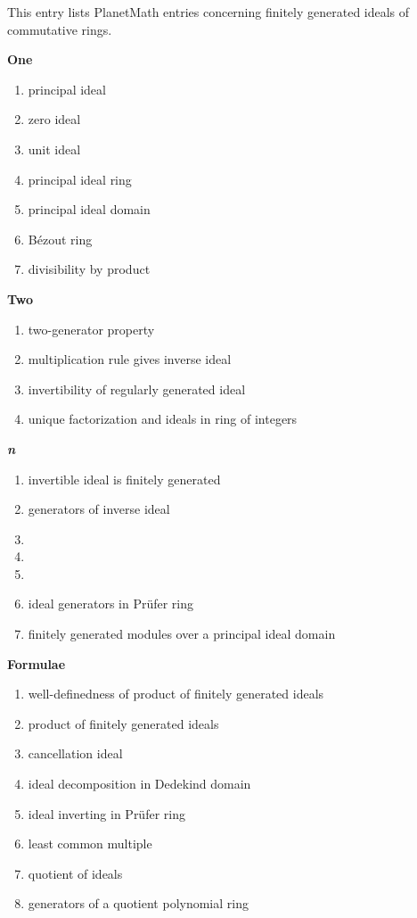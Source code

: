 \documentclass[12pt]{article}
\theoremstyle{definition}
\begin{document}
This entry lists PlanetMath entries concerning finitely generated ideals of commutative rings.

\textbf{One }
\begin{enumerate}
 \item principal ideal
 \item zero ideal
 \item unit ideal
 \item principal ideal ring
 \item principal ideal domain
 \item B\'ezout ring
 \item divisibility by product
\end{enumerate}

\textbf{Two }
\begin{enumerate}
 \item two-generator property
 \item multiplication rule gives inverse ideal
 \item invertibility of regularly generated ideal
 \item unique factorization and ideals in ring of integers
\end{enumerate}

\textbf{{\em n} }
\begin{enumerate}
 \item invertible ideal is finitely generated
 \item generators of inverse ideal
 \item {}
 \item {}
 \item {}
 \item ideal generators in Pr\"ufer ring
 \item finitely generated modules over a principal ideal domain
\end{enumerate}

\textbf{Formulae}
\begin{enumerate}
 \item well-definedness of product of finitely generated ideals
 \item product of finitely generated ideals
 \item cancellation ideal
 \item ideal decomposition in Dedekind domain
 \item ideal inverting in Pr\"ufer ring
 \item least common multiple
 \item quotient of ideals
 \item generators of a quotient polynomial ring
\end{enumerate}
\end{document}
